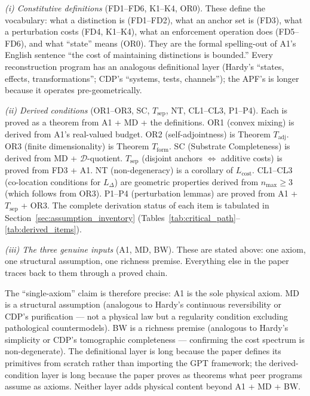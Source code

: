 \documentclass[11pt]{article}
\theoremstyle{remark}
\begin{document}
\emph{(i) Constitutive definitions} (FD1--FD6, K1--K4, OR0).  These define the vocabulary: what a distinction is (FD1--FD2), what an anchor set is (FD3), what a perturbation costs (FD4, K1--K4), what an enforcement operation does (FD5--FD6), and what ``state'' means (OR0).  They are the formal spelling-out of A1's English sentence ``the cost of maintaining distinctions is bounded.''  Every reconstruction program has an analogous definitional layer (Hardy's ``states, effects, transformations''; CDP's ``systems, tests, channels''); the APF's is longer because it operates pre-geometrically.

\emph{(ii) Derived conditions} (OR1--OR3, SC, $T_{\mathrm{sep}}$, NT, CL1--CL3, P1--P4).  Each is proved as a theorem from A1 + MD + the definitions.  OR1 (convex mixing) is derived from A1's real-valued budget.  OR2 (self-adjointness) is Theorem $T_{\mathrm{adj}}$.  OR3 (finite dimensionality) is Theorem $T_{\mathrm{form}}$.  SC (Substrate Completeness) is derived from MD + $\mathcal{D}$-quotient.  $T_{\mathrm{sep}}$ (disjoint anchors $\Leftrightarrow$ additive costs) is proved from FD3 + A1.  NT (non-degeneracy) is a corollary of $L_{\mathrm{cost}}$.  CL1--CL3 (co-location conditions for $L_\Delta$) are geometric properties derived from $n_{\max} \ge 3$ (which follows from OR3).  P1--P4 (perturbation lemmas) are proved from A1 + $T_{\mathrm{sep}}$ + OR3.  The complete derivation status of each item is tabulated in Section~\ref{sec:assumption_inventory} (Tables~\ref{tab:critical_path}--\ref{tab:derived_items}).

\emph{(iii) The three genuine inputs} (A1, MD, BW).  These are stated above: one axiom, one structural assumption, one richness premise.  Everything else in the paper traces back to them through a proved chain.

The ``single-axiom'' claim is therefore precise: A1 is the sole physical axiom.  MD is a structural assumption (analogous to Hardy's continuous reversibility or CDP's purification --- not a physical law but a regularity condition excluding pathological countermodels).  BW is a richness premise (analogous to Hardy's simplicity or CDP's tomographic completeness --- confirming the cost spectrum is non-degenerate).  The definitional layer is long because the paper defines its primitives from scratch rather than importing the GPT framework; the derived-condition layer is long because the paper proves as theorems what peer programs assume as axioms.  Neither layer adds physical content beyond A1 + MD + BW.
\end{document}
